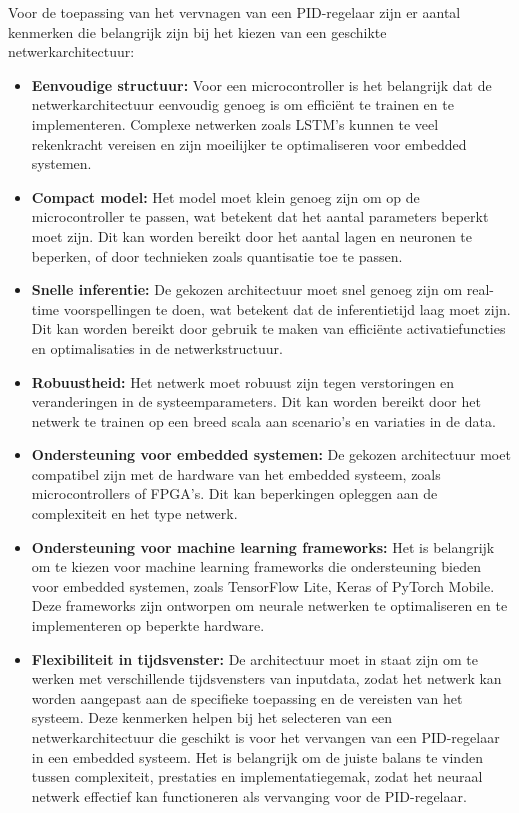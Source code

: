 Voor de toepassing van het vervnagen van een PID-regelaar zijn er aantal kenmerken die belangrijk zijn bij het kiezen van een geschikte netwerkarchitectuur:
\begin{itemize}
  \item \textbf{Eenvoudige structuur:} Voor een microcontroller is het belangrijk dat de netwerkarchitectuur eenvoudig genoeg is om efficiënt te trainen en te implementeren. Complexe netwerken zoals LSTM's kunnen te veel rekenkracht vereisen en zijn moeilijker te optimaliseren voor embedded systemen.
  \item \textbf{Compact model:} Het model moet klein genoeg zijn om op de microcontroller te passen, wat betekent dat het aantal parameters beperkt moet zijn. Dit kan worden bereikt door het aantal lagen en neuronen te beperken, of door technieken zoals quantisatie toe te passen.
  \item \textbf{Snelle inferentie:} De gekozen architectuur moet snel genoeg zijn om real-time voorspellingen te doen, wat betekent dat de inferentietijd laag moet zijn. Dit kan worden bereikt door gebruik te maken van efficiënte activatiefuncties en optimalisaties in de netwerkstructuur.
  \item \textbf{Robuustheid:} Het netwerk moet robuust zijn tegen verstoringen en veranderingen in de systeemparameters. Dit kan worden bereikt door het netwerk te trainen op een breed scala aan scenario's en variaties in de data.
  \item \textbf{Ondersteuning voor embedded systemen:} De gekozen architectuur moet compatibel zijn met de hardware van het embedded systeem, zoals microcontrollers of FPGA's. Dit kan beperkingen opleggen aan de complexiteit en het type netwerk.
  \item \textbf{Ondersteuning voor machine learning frameworks:} Het is belangrijk om te kiezen voor machine learning frameworks die ondersteuning bieden voor embedded systemen, zoals TensorFlow Lite, Keras of PyTorch Mobile. Deze frameworks zijn ontworpen om neurale netwerken te optimaliseren en te implementeren op beperkte hardware.
  \item \textbf{Flexibiliteit in tijdsvenster:} De architectuur moet in staat zijn om te werken met verschillende tijdsvensters van inputdata, zodat het netwerk kan worden aangepast aan de specifieke toepassing en de vereisten van het systeem.
Deze kenmerken helpen bij het selecteren van een netwerkarchitectuur die geschikt is voor het vervangen van een PID-regelaar in een embedded systeem. Het is belangrijk om de juiste balans te vinden tussen complexiteit, prestaties en implementatiegemak, zodat het neuraal netwerk effectief kan functioneren als vervanging voor de PID-regelaar.



\end{itemize}
